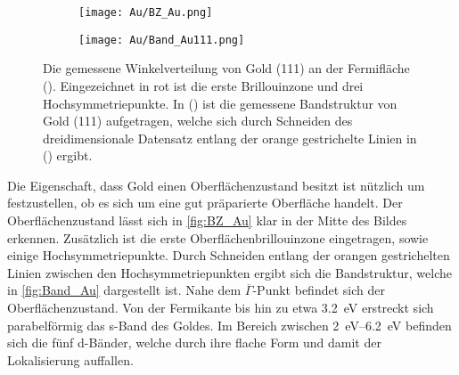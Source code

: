         \begin{figure}
            \centering
            \begin{subfigure}[t]{0.34\textwidth}
                \centering
                \texttt{[image: Au/BZ\_Au.png]}
                \subcaption{}
                \label{fig:BZ_Au}
            \end{subfigure}
            \begin{subfigure}[t]{0.62\textwidth}
                \centering
                \texttt{[image: Au/Band\_Au111.png]}
                \subcaption{}
                \label{fig:Band_Au}
            \end{subfigure}
            \caption{Die gemessene Winkelverteilung von Gold (111) an der Fermifläche ().
            Eingezeichnet in rot ist die erste Brillouinzone und drei Hochsymmetriepunkte.
            In () ist die gemessene Bandstruktur von Gold (111) aufgetragen, welche sich durch Schneiden des dreidimensionale Datensatz entlang der orange gestrichelte Linien in () ergibt.}
        \end{figure}
        Die Eigenschaft, dass Gold einen Oberflächenzustand besitzt ist nützlich um festzustellen, ob es sich um eine gut präparierte Oberfläche handelt.
        Der Oberflächenzustand lässt sich in \autoref{fig:BZ_Au} klar in der Mitte des Bildes erkennen.
        Zusätzlich ist die erste Oberflächenbrillouinzone eingetragen, sowie einige Hochsymmetriepunkte.
        Durch Schneiden entlang der orangen gestrichelten Linien zwischen den Hochsymmetriepunkten ergibt sich die Bandstruktur, welche in \autoref{fig:Band_Au} dargestellt ist.
        Nahe dem $\overline{\Gamma}$-Punkt befindet sich der Oberflächenzustand.
        Von der Fermikante bis hin zu etwa \SI{3.2}{\electronvolt} erstreckt sich parabelförmig das s-Band des Goldes.
        Im Bereich zwischen \SIrange{2}{6.2}{\electronvolt} befinden sich die fünf d-Bänder, welche durch ihre flache Form und damit der Lokalisierung auffallen.

